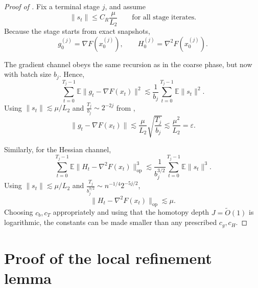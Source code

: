 \documentclass{article}
\theoremstyle{plain}
\theoremstyle{definition}
\theoremstyle{remark}
\begin{document}
\begin{proof}[Proof of ]
Fix a terminal stage \(j\), and assume
\[
\|s_t\|\le C_R\frac{\mu}{L_2}
\qquad \text{for all stage iterates.}
\]
Because the stage starts from exact snapshots,
\[
g_0^{(j)}=\nabla F(x_0^{(j)}),
\qquad
H_0^{(j)}=\nabla^2F(x_0^{(j)}).
\]

The gradient channel obeys the same recursion as in the coarse phase, but now with batch size \(b_j\). Hence,
\[
\sum_{t=0}^{T_j-1}\mathbb E\|g_t-\nabla F(x_t)\|^2
\lesssim
\frac1{b_j}\sum_{t=0}^{T_j-1}\mathbb E\|s_t\|^2.
\]
Using \(\|s_t\|\lesssim \mu/L_2\) and \(\frac{T_j}{b_j}\sim 2^{-2j}\) from ,
\[
\|g_t-\nabla F(x_t)\|
\lesssim
\frac{\mu}{L_2}\sqrt{\frac{T_j}{b_j}}
\lesssim
\frac{\mu^2}{L_2}
=
\varepsilon.
\]

Similarly, for the Hessian channel,
\[
\sum_{t=0}^{T_j-1}\mathbb E\|H_t-\nabla^2F(x_t)\|_{\mathrm{op}}^3
\lesssim
\frac1{b_j^{3/2}}\sum_{t=0}^{T_j-1}\mathbb E\|s_t\|^3.
\]
Using \(\|s_t\|\lesssim \mu/L_2\) and \(\frac{T_j}{b_j^{3/2}}\sim n^{-1/4}2^{-5j/2}\),
\[
\|H_t-\nabla^2F(x_t)\|_{\mathrm{op}}
\lesssim
\mu.
\]
Choosing \(c_b,c_T\) appropriately and using that the homotopy depth \(J=\widetilde O(1)\) is logarithmic, the constants can be made smaller than any prescribed \(c_g,c_H\).
\end{proof}

\section{Proof of the local refinement lemma}\label{app:local}
\end{document}
